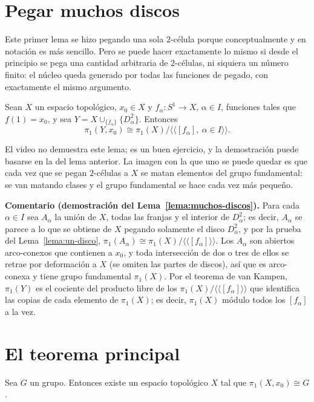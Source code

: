 \documentclass[11pt]{article}
\begin{document}
\section*{Pegar muchos discos}

Este primer lema se hizo pegando una sola $2$-célula porque conceptualmente y en notación es más sencillo. Pero se puede hacer exactamente lo mismo si desde el principio se pega una cantidad arbitraria de $2$-células, ni siquiera un número finito: el núcleo queda generado por todas las funciones de pegado, con exactamente el mismo argumento.

\begin{lema}\label{lema:muchos-discos}
Sean $X$ un espacio topológico, $x_0\in X$ y $f_\alpha\colon S^1\to X$, $\alpha\in I$, funciones tales que $f(1)=x_0$, y sea $Y=X\cup_{\{f_\alpha\}}\{D^2_\alpha\}$. Entonces
\[
  \pi_1(Y,x_0)\cong\pi_1(X)\big/\langle\!\langle[f_\alpha],\ \alpha\in I\rangle\!\rangle.
\]
\end{lema}

El video no demuestra este lema; es un buen ejercicio, y la demostración puede basarse en la del lema anterior. La imagen con la que uno se puede quedar es que cada vez que se pegan $2$-células a $X$ se matan elementos del grupo fundamental: se van matando clases y el grupo fundamental se hace cada vez más pequeño.

\medskip\noindent\textbf{Comentario (demostración del Lema~\ref{lema:muchos-discos}).} Para cada $\alpha\in I$ sea $A_\alpha$ la unión de $X$, todas las franjas y el interior de $D^2_\alpha$; es decir, $A_\alpha$ se parece a lo que se obtiene de $X$ pegando solamente el disco $D^2_\alpha$, y por la prueba del Lema~\ref{lema:un-disco}, $\pi_1(A_\alpha)\cong\pi_1(X)/\langle\!\langle[f_\alpha]\rangle\!\rangle$. Los $A_\alpha$ son abiertos arco-conexos que contienen a $x_0$, y toda intersección de dos o tres de ellos se retrae por deformación a $X$ (se omiten las partes de discos), así que es arco-conexa y tiene grupo fundamental $\pi_1(X)$. Por el teorema de van Kampen, $\pi_1(Y)$ es el cociente del producto libre de los $\pi_1(X)/\langle\!\langle[f_\alpha]\rangle\!\rangle$ que identifica las copias de cada elemento de $\pi_1(X)$; es decir, $\pi_1(X)$ módulo todos los $[f_\alpha]$ a la vez.


\section*{El teorema principal}

\begin{teo}\label{teo:todo-grupo}
Sea $G$ un grupo. Entonces existe un espacio topológico $X$ tal que $\pi_1(X,x_0)\cong G$.
\end{teo}
\end{document}
